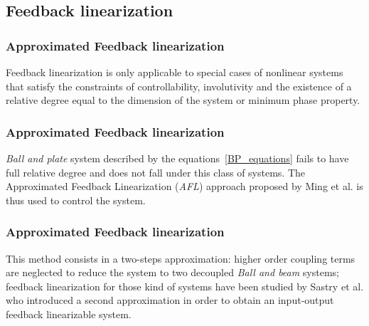 \subsection{Feedback linearization}
\begin{frame}
\frametitle{Approximated Feedback linearization}
Feedback linearization is only applicable to special cases of nonlinear systems that satisfy the constraints of controllability, involutivity and the existence of a relative degree equal to the dimension of the system or minimum phase property.
\end{frame}
%
\begin{frame}
\frametitle{Approximated Feedback linearization}
\textit{Ball and plate} system described by the equations~\ref{BP_equations} fails to have full relative degree and does not fall under this class of systems. The Approximated Feedback Linearization (\textit{AFL}) approach proposed by Ming et al. is thus used to control the system.
\end{frame}
%
\begin{frame}
\frametitle{Approximated Feedback linearization}
This method consists in a two-steps approximation: higher order coupling terms are neglected to reduce the system to two decoupled \textit{Ball and beam} systems; feedback linearization for those kind of systems have been studied by Sastry et al.  who introduced a second approximation in order to obtain an input-output feedback linearizable system.
\end{frame}
%
